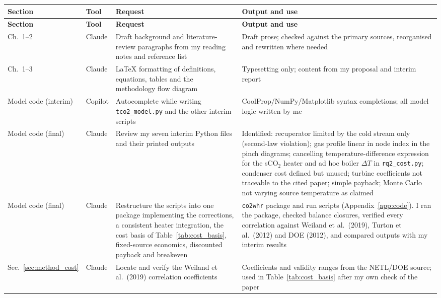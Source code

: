 \begin{longtable}{>{\raggedright\arraybackslash}p{2.2cm}
  >{\raggedright\arraybackslash}p{1.6cm}
  >{\raggedright\arraybackslash}p{4.3cm}
  >{\raggedright\arraybackslash}p{6.0cm}}
\toprule
\rowcolor{tableheader}
\textbf{Section} & \textbf{Tool} & \textbf{Request} & \textbf{Output and use} \\
\midrule
\endfirsthead
\toprule
\rowcolor{tableheader}
\textbf{Section} & \textbf{Tool} & \textbf{Request} & \textbf{Output and use} \\
\midrule
\endhead
\bottomrule
\endlastfoot
Ch.~1--2 & Claude & Draft background and literature-review paragraphs from my reading notes and reference list & Draft prose; checked against the primary sources, reorganised and rewritten where needed \\
Ch.~1--3 & Claude & \LaTeX{} formatting of definitions, equations, tables and the methodology flow diagram & Typesetting only; content from my proposal and interim report \\
Model code (interim) & Copilot & Autocomplete while writing \texttt{tco2\_model.py} and the other interim scripts & CoolProp/NumPy/Matplotlib syntax completions; all model logic written by me \\
Model code (final) & Claude & Review my seven interim Python files and their printed outputs & Identified: recuperator limited by the cold stream only (second-law violation); gas profile linear in node index in the pinch diagrams; cancelling temperature-difference expression for the sCO$_2$ heater and ad hoc boiler $\Delta T$ in \texttt{rq2\_cost.py}; condenser cost defined but unused; turbine coefficients not traceable to the cited paper; simple payback; Monte Carlo not varying source temperature as claimed \\
Model code (final) & Claude & Restructure the scripts into one package implementing the corrections, a consistent heater integration, the cost basis of Table~\ref{tab:cost_basis}, fixed-source economics, discounted payback and breakeven & \texttt{co2whr} package and run scripts (Appendix~\ref{app:code}). I ran the package, checked balance closures, verified every correlation against Weiland et al.~(2019), Turton et al.~(2012) and DOE (2012), and compared outputs with my interim results \\
Sec.~\ref{sec:method_cost} & Claude & Locate and verify the Weiland et al.~(2019) correlation coefficients & Coefficients and validity ranges from the NETL/DOE source; used in Table~\ref{tab:cost_basis} after my own check of the paper \\

\end{longtable}
